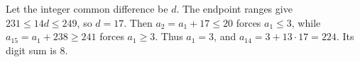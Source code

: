 Let the integer common difference be $d$. The endpoint ranges give $231\le14d\le249$, so $d=17$. Then $a_2=a_1+17\le20$ forces $a_1\le3$, while $a_{15}=a_1+238\ge241$ forces $a_1\ge3$. Thus $a_1=3$, and $a_{14}=3+13\cdot17=224$. Its digit sum is $\boxed8$.
